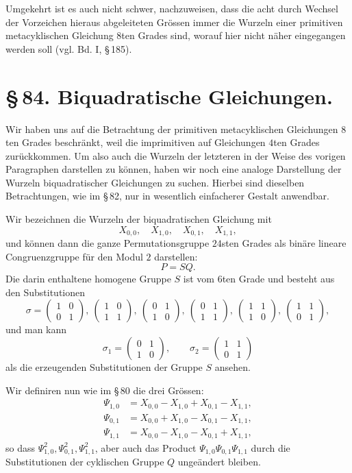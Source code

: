 \documentclass[11pt]{article}
\providecommand{\mat}[4]{\begin{pmatrix}#1&#2\\#3&#4\end{pmatrix}}
\providecommand{\mat}[4]{\begin{pmatrix}#1&#2\\#3&#4\end{pmatrix}}
\begin{document}
Umgekehrt ist es auch nicht schwer, nachzuweisen, dass die acht durch Wechsel der Vorzeichen hieraus abgeleiteten Grössen immer die Wurzeln einer primitiven metacyklischen Gleichung $8$ten Grades sind, worauf hier nicht näher eingegangen werden soll (vgl. Bd. I, \S\,185).

\section*{\S\,84. Biquadratische Gleichungen.}

Wir haben uns auf die Betrachtung der primitiven metacyklischen Gleichungen $8$ten Grades beschränkt, weil die imprimitiven auf Gleichungen $4$ten Grades zurückkommen. Um also auch die Wurzeln der letzteren in der Weise des vorigen Paragraphen darstellen zu können, haben wir noch eine analoge Darstellung der Wurzeln biquadratischer Gleichungen zu suchen. Hierbei sind dieselben Betrachtungen, wie im \S\,82, nur in wesentlich einfacherer Gestalt anwendbar.

Wir bezeichnen die Wurzeln der biquadratischen Gleichung mit
\begin{equation}
 X_{0,0},\quad X_{1,0},\quad X_{0,1},\quad X_{1,1},
 \tag{1}
\end{equation}
und können dann die ganze Permutationsgruppe $24$sten Grades als binäre lineare Congruenzgruppe für den Modul $2$ darstellen:
\begin{equation}
 P=SQ.
 \tag{2}
\end{equation}
Die darin enthaltene homogene Gruppe $S$ ist vom $6$ten Grade und besteht aus den Substitutionen
\begin{equation}
 \sigma=\mat{1}{0}{0}{1},\ \mat{1}{0}{1}{1},\ \mat{0}{1}{1}{0},\ \mat{0}{1}{1}{1},\ \mat{1}{1}{1}{0},\ \mat{1}{1}{0}{1},
 \tag{3}
\end{equation}
und man kann
\begin{equation}
 \sigma_1=\mat{0}{1}{1}{0},
 \qquad
 \sigma_2=\mat{1}{1}{0}{1}
 \tag{4}
\end{equation}
als die erzeugenden Substitutionen der Gruppe $S$ ansehen.

Wir definiren nun wie im \S\,80 die drei Grössen:
\begin{equation}
\begin{aligned}
 \Psi_{1,0}&=X_{0,0}-X_{1,0}+X_{0,1}-X_{1,1},\\
 \Psi_{0,1}&=X_{0,0}+X_{1,0}-X_{0,1}-X_{1,1},\\
 \Psi_{1,1}&=X_{0,0}-X_{1,0}-X_{0,1}+X_{1,1},
\end{aligned}
\tag{5}
\end{equation}
so dass $\Psi_{1,0}^2,\Psi_{0,1}^2,\Psi_{1,1}^2$, aber auch das Product $\Psi_{1,0}\Psi_{0,1}\Psi_{1,1}$ durch die Substitutionen der cyklischen Gruppe $Q$ ungeändert bleiben.
\end{document}
